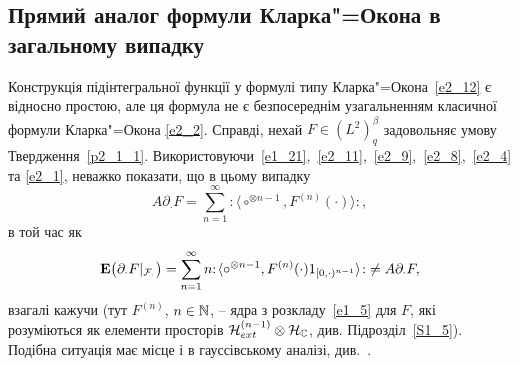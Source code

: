 \subsection{Прямий аналог формули Кларка"=Окона в загальному випадку}
Конструкція підінтегральної функції у формулі типу Кларка"=Окона~\eqref{e2_12} є відносно
простою, але ця формула не є безпосереднім узагальненням класичної формули Кларка"=Окона
\eqref{e2_2}. Справді, нехай $F\in (L^2)^\beta_q$ задовольняє умову Твердження~\ref{p2_1_1}.
Використовуючи~\eqref{e1_21},~\eqref{e2_11},~\eqref{e2_9},~\eqref{e2_8},~\eqref{e2_4} та
\eqref{e2_1}, неважко показати, що в цьому випадку
\begin{equation*}
A\partial_\cdot F=\sum_{n=1}^\infty{:\!\langle}\circ^{\otimes n-1},F^{(n)}(\cdot){\rangle\!:},
\end{equation*}
в той час як
\begin{equation*}
\mathbf{E}\big(\partial_\cdot F|_{\mathcal F_\cdot}\big)
=\sum_{n=1}^\infty n{:\!\langle}\circ^{\otimes n-1},F^{(n)}(\cdot)1_{[0,\cdot)^{n-1}}{\rangle\!:}
\not=A\partial_\cdot F,
\end{equation*}
взагалі кажучи (тут $F^{(n)}$, $n\in\mathbb{N}$, -- ядра з розкладу~\eqref{e1_5} для $F$, які
розуміються як елементи просторів $\mathcal{H}_{ext}^{(n-1)}\otimes\mathcal{H}_{\mathbb{C}}$,
див. Підрозділ~\ref{S1_5}). Подібна ситуація має місце і в гауссівському аналізі,
див.~\cite{K11c}.

